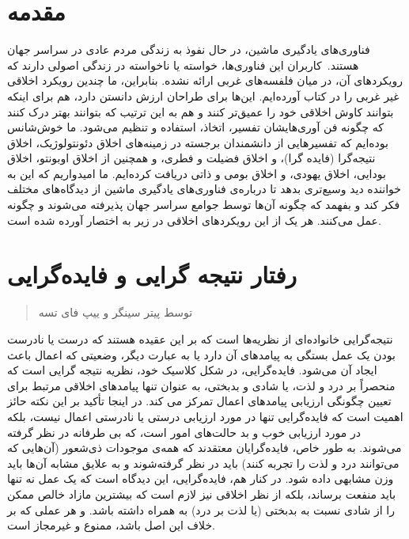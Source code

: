 \documentclass[12pt,oneside]{book}
\begin{document}
    \section*{مقدمه}
    فناوری‌های یادگیری ماشین، در حال نفوذ به زندگی مردم عادی در سراسر جهان هستند.\     كاربران اين فناوری‌ها، خواسته یا ناخواسته در زندگی اصولی دارند که رویکردهای آن، در میان فلفسه‌های غربی ارائه نشده.
    بنابراین، ما چندین رویکرد اخلاقی غیر غربی را در کتاب آورده‌ایم.
    این‌ها برای طراحان ارزش دانستن دارد، هم برای اینکه بتوانند کاوش اخلاقی خود را عمیق‌تر کنند و هم به این ترتیب که بتوانند بهتر درک کنند که چگونه فن آوری‌هایشان تفسیر، اتخاذ، استفاده و تنظیم می‌شود.
    ما خوش‌شانس بوده‌ایم که تفسیرهایی از دانشمندان برجسته در زمینه‌های اخلاق دئونتولوژیک، اخلاق نتیجه‌گرا (فایده گرا)، و اخلاق فضیلت و فطری، و همچنین از اخلاق اوبونتو، اخلاق بودایی، اخلاق یهودی، و اخلاق بومی و ذاتی دریافت کرده‌ایم.
    ما امیدواریم که این به خواننده دید وسیع‌تری بدهد تا درباره‌ی فناوری‌های یادگیری ماشین از دیدگاه‌های مختلف فکر کند و بفهمد که چگونه آن‌ها توسط جوامع سراسر جهان پذیرفته می‌شوند و چگونه عمل می‌کنند.
    هر یک از این رویکردهای اخلاقی در زیر به اختصار آورده شده است.


    \section*{رفتار نتیجه گرایی و فایده‌گرایی}
    \begin{quote}
        توسط پیتر سینگر و ییپ فای تسه
    \end{quote}

    نتیجه‌گرایی خانواده‌ای از نظریه‌ها است که بر این عقیده هستند که درست یا نادرست بودن یک عمل بستگی به پیامدهای آن دارد یا به عبارت دیگر، وضعیتی که اعمال باعث ایجاد آن می‌شود.
    فایده‌گرایی، در شکل کلاسیک خود، نظریه نتیجه گرایی است که منحصراً بر درد و لذت، یا شادی و بدبختی، به عنوان تنها پیامدهای اخلاقی مرتبط برای تعیین چگونگی ارزیابی پیامدهای اعمال تمرکز می کند.
    در اینجا تأکید بر این نکته حائز اهمیت است که فایده‌گرایی تنها در مورد ارزیابی درستی یا نادرستی اعمال نیست، بلکه در مورد ارزیابی خوب و بد حالت‌های امور است، که بی طرفانه در نظر گرفته می‌شوند.
    به طور خاص، فایده‌گرایان معتقدند که همه‌ی موجودات ذی‌شعور (آن‌هایی که می‌توانند درد و لذت را تجربه کنند) باید در نظر گرفته‌شوند و به علایق مشابه آن‌ها باید وزن مشابهی داده شود.
    در کنار هم، فایده‌گرایی، این دیدگاه است که یک عمل نه تنها باید منفعت برساند، بلکه از نظر اخلاقی نیز لازم است که بیشترین مازاد خالص ممکن را از شادی نسبت به بدبختی (یا لذت بر درد) به همراه داشته باشد.
    و هر عملی که بر خلاف این اصل باشد، ممنوع و غیرمجاز است.
\end{document}
